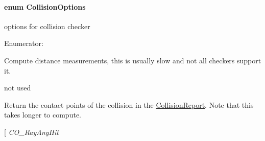 \hypertarget{namespaceOpenRAVE_a6963e4ecb981351b8fb2e3f9e85acf77}{
\paragraph[{CollisionOptions}]{\setlength{\rightskip}{0pt plus 5cm}enum {\bf CollisionOptions}}\hfill}
\label{namespaceOpenRAVE_a6963e4ecb981351b8fb2e3f9e85acf77}


options for collision checker 

\begin{Desc}
\item[Enumerator: ]\par
\begin{description}
\item[{\em 
\hypertarget{namespaceOpenRAVE_a6963e4ecb981351b8fb2e3f9e85acf77aa5d8d85bd05b340ada98305788f161d4}{
CO\_\-Distance}
\label{namespaceOpenRAVE_a6963e4ecb981351b8fb2e3f9e85acf77aa5d8d85bd05b340ada98305788f161d4}
}]Compute distance measurements, this is usually slow and not all checkers support it. \item[{\em 
\hypertarget{namespaceOpenRAVE_a6963e4ecb981351b8fb2e3f9e85acf77add08e96e785c0ad01b5687ffc50a095d}{
CO\_\-UseTolerance}
\label{namespaceOpenRAVE_a6963e4ecb981351b8fb2e3f9e85acf77add08e96e785c0ad01b5687ffc50a095d}
}]not used \item[{\em 
\hypertarget{namespaceOpenRAVE_a6963e4ecb981351b8fb2e3f9e85acf77a9bc2191e9e7b6bfc5fa1807812c45c6c}{
CO\_\-Contacts}
\label{namespaceOpenRAVE_a6963e4ecb981351b8fb2e3f9e85acf77a9bc2191e9e7b6bfc5fa1807812c45c6c}
}]Return the contact points of the collision in the \hyperlink{classOpenRAVE_1_1CollisionReport}{CollisionReport}. Note that this takes longer to compute. \item[{\em 
\hypertarget{namespaceOpenRAVE_a6963e4ecb981351b8fb2e3f9e85acf77a7572c8fd23c74ad1aa04e18eb36808b6}{
CO\_\-RayAnyHit}
\label{namespaceOpenRAVE_a6963e4ecb981351b8fb2e3f9e85acf77a7572c8fd23c74ad1aa04e18eb36808b6}
}
\end{description}
\end{Desc}
